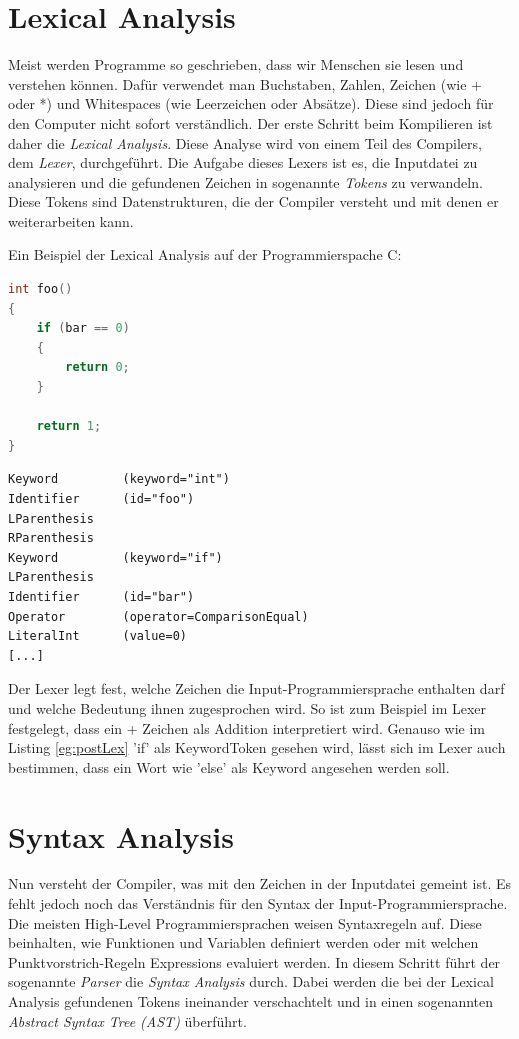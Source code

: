 \section{Lexical Analysis}
Meist werden Programme so geschrieben, dass wir Menschen sie lesen und verstehen können. Dafür verwendet man Buchstaben, Zahlen, Zeichen (wie + oder *) und Whitespaces (wie Leerzeichen oder Absätze).
Diese sind jedoch für den Computer nicht sofort verständlich. Der erste Schritt beim Kompilieren ist daher die \textit{Lexical Analysis}. Diese Analyse wird von einem Teil des Compilers, dem \textit{Lexer}, durchgeführt.
Die Aufgabe dieses Lexers ist es, die Inputdatei zu analysieren und die gefundenen Zeichen in sogenannte \textit{Tokens} zu verwandeln. Diese Tokens sind Datenstrukturen, die der Compiler versteht und mit denen er weiterarbeiten kann.

Ein Beispiel der Lexical Analysis auf der Programmierspache C:

\begin{lstlisting}[language=C, label=eg:preLex, caption=C code vor Lexical Analysis]
int foo()
{
    if (bar == 0)
    {
        return 0;
    }

    return 1;
}
\end{lstlisting}

\begin{lstlisting}[label=eg:postLex, caption=Tokens nach Lexical Analysis]
Keyword         (keyword="int")
Identifier      (id="foo")
LParenthesis
RParenthesis
Keyword         (keyword="if")
LParenthesis
Identifier      (id="bar")
Operator        (operator=ComparisonEqual)
LiteralInt      (value=0)
[...]
\end{lstlisting}

Der Lexer legt fest, welche Zeichen die Input-Programmiersprache enthalten darf und welche Bedeutung ihnen zugesprochen wird. So ist zum Beispiel im Lexer festgelegt, dass ein + Zeichen als Addition interpretiert wird.
Genauso wie im Listing \ref{eg:postLex} 'if' als KeywordToken gesehen wird, lässt sich im Lexer auch bestimmen, dass ein Wort wie 'else' als Keyword angesehen werden soll.

\section{Syntax Analysis}
Nun versteht der Compiler, was mit den Zeichen in der Inputdatei gemeint ist. Es fehlt jedoch noch das Verständnis für den Syntax der Input-Programmiersprache.
Die meisten High-Level Programmiersprachen weisen Syntaxregeln auf. Diese beinhalten, wie Funktionen und Variablen definiert werden oder mit welchen Punktvorstrich-Regeln Expressions evaluiert werden.
In diesem Schritt führt der sogenannte \textit{Parser} die \textit{Syntax Analysis} durch.
Dabei werden die bei der Lexical Analysis gefundenen Tokens ineinander verschachtelt und in einen sogenannten \textit{Abstract Syntax Tree (AST)} überführt.

